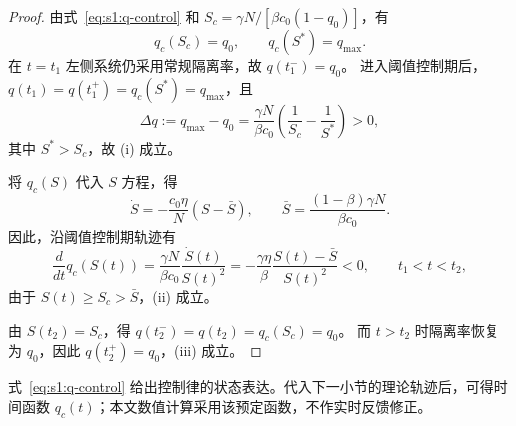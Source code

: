 \documentclass[lang=cn,a4paper,newtx]{elegantpaper}
\numberwithin{equation}{section}
\theoremstyle{plain}
\begin{document}
\begin{proof}
由式~\eqref{eq:s1:q-control} 和 $S_c=\gamma N/[\beta c_0(1-q_0)]$，有
\[
q_c(S_c)=q_0,\qquad q_c(S^*)=q_{\max}.
\]
在 $t=t_1$ 左侧系统仍采用常规隔离率，故 $q(t_1^-)=q_0$。
进入阈值控制期后，$q(t_1)=q(t_1^+)=q_c(S^*)=q_{\max}$，且
\[
\Delta q:=q_{\max}-q_0
=\frac{\gamma N}{\beta c_0}
\left(\frac{1}{S_c}-\frac{1}{S^*}\right)>0,
\]
其中 $S^*>S_c$，故 (i) 成立。

将 $q_c(S)$ 代入 $S$ 方程，得
\[
\dot S=-\frac{c_0\eta}{N}(S-\bar S),\qquad
\bar S=\frac{(1-\beta)\gamma N}{\beta c_0}.
\]
因此，沿阈值控制期轨迹有
\[
\frac{d}{dt}q_c(S(t))
=\frac{\gamma N}{\beta c_0}\frac{\dot S(t)}{S(t)^2}
=-\frac{\gamma\eta}{\beta}\frac{S(t)-\bar S}{S(t)^2}<0,
\qquad t_1<t<t_2,
\]
由于 $S(t)\ge S_c>\bar S$，(ii) 成立。

由 $S(t_2)=S_c$，得 $q(t_2^-)=q(t_2)=q_c(S_c)=q_0$。
而 $t>t_2$ 时隔离率恢复为 $q_0$，因此 $q(t_2^+)=q_0$，(iii) 成立。
\end{proof}

\begin{remark}
式~\eqref{eq:s1:q-control} 给出控制律的状态表达。代入下一小节的理论轨迹后，可得时间函数 $q_c(t)$；本文数值计算采用该预定函数，不作实时反馈修正。
\end{remark}
\end{document}
